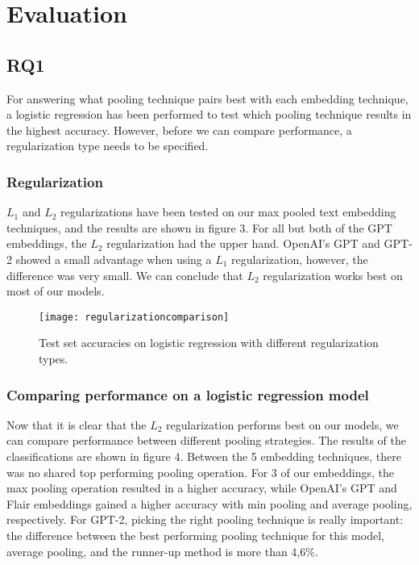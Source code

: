 \section{Evaluation}
\subsection{RQ1}
For answering what pooling technique pairs best with each embedding technique, a logistic regression has been performed to test which pooling technique results in the highest accuracy.
However, before we can compare performance, a regularization type needs to be specified. 

\subsubsection{Regularization}

$L_{1}$ and $L_{2}$ regularizations have been tested on our max pooled text embedding techniques, and the results are shown in figure 3.
For all but both of the GPT embeddings, the $L_{2}$ regularization had the upper hand.
OpenAI's GPT and GPT-2 showed a small advantage when using a $L_{1}$ regularization, however, the difference was very small.
We can conclude that $L_{2}$ regularization works best on most of our models.

\begin{figure}[h]
    \centering
    \texttt{[image: regularizationcomparison]}
    \caption{Test set accuracies on logistic regression with different regularization types.}
\end{figure}

\subsubsection{Comparing performance on a logistic regression model}
Now that it is clear that the $L_{2}$ regularization performs best on our models, we can compare performance between different pooling strategies.
The results of the classifications are shown in figure 4.
Between the 5 embedding techniques, there was no shared top performing pooling operation. 
For 3 of our embeddings, the max pooling operation resulted in a higher accuracy, while OpenAI's GPT and Flair embeddings gained a higher accuracy with min pooling and average pooling, respectively.
For GPT-2, picking the right pooling technique is really important: the difference between the best performing pooling technique for this model, average pooling, and the runner-up method is more than 4,6\%. 

